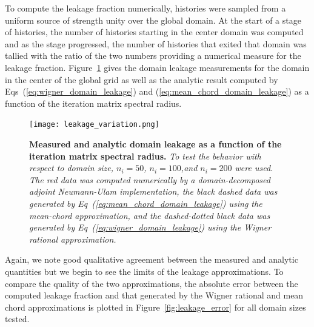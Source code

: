 \documentclass{mc2013}
\begin{document}
To compute the leakage fraction numerically,  histories were
sampled from a uniform source of strength unity over the global
domain. At the start of a stage of histories, the number of histories
starting in the center domain was computed and as the stage
progressed, the number of histories that exited that domain was
tallied with the ratio of the two numbers providing a numerical
measure for the leakage fraction. Figure~\ref{fig:measured_leakage}
gives the domain leakage measurements for the domain in the center of
the global grid as well as the analytic result computed by
Eqs~(\ref{eq:wigner_domain_leakage}) and
(\ref{eq:mean_chord_domain_leakage}) as a function of the iteration
matrix spectral radius.
\begin{figure}[ht!]
  \begin{spacing}{1.0}
    \begin{center}
      \texttt{[image: leakage\_variation.png]}
    \end{center}
    \caption{\textbf{Measured and analytic domain leakage as a
        function of the iteration matrix spectral radius.} \textit{To
        test the behavior with respect to domain size, $n_i=50$,
        $n_i=100$,and $n_i=200$ were used. The red data was computed
        numerically by a domain-decomposed adjoint Neumann-Ulam
        implementation, the black dashed data was generated by
        Eq~(\ref{eq:mean_chord_domain_leakage}) using the mean-chord
        approximation, and the dashed-dotted black data was generated
        by Eq~(\ref{eq:wigner_domain_leakage}) using the Wigner
        rational approximation.}}
    \label{fig:measured_leakage}
  \end{spacing}
\end{figure}
Again, we note good qualitative agreement between the measured and
analytic quantities but we begin to see the limits of the leakage
approximations. To compare the quality of the two approximations, the
absolute error between the computed leakage fraction and that
generated by the Wigner rational and mean chord approximations is
plotted in Figure~\ref{fig:leakage_error} for all domain sizes
tested. 
\end{document}
